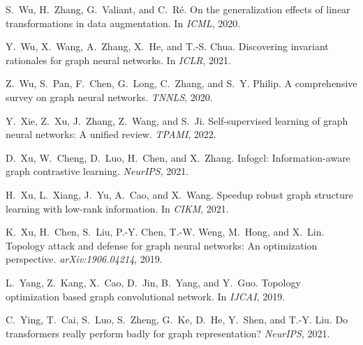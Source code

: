 \documentclass[11pt]{article}
\begin{document}
\begin{thebibliography}{10}
\begin{small}
S.~Wu, H.~Zhang, G.~Valiant, and C.~R{\'e}.
\newblock On the generalization effects of linear transformations in data
  augmentation.
\newblock In \emph{ICML}, 2020{}.

Y.~Wu, X.~Wang, A.~Zhang, X.~He, and T.-S. Chua.
\newblock Discovering invariant rationales for graph neural networks.
\newblock In \emph{ICLR}, 2021.

Z.~Wu, S.~Pan, F.~Chen, G.~Long, C.~Zhang, and S.~Y. Philip.
\newblock A comprehensive survey on graph neural networks.
\newblock \emph{TNNLS}, 2020{}.

Y.~Xie, Z.~Xu, J.~Zhang, Z.~Wang, and S.~Ji.
\newblock Self-supervised learning of graph neural networks: A unified review.
\newblock \emph{TPAMI}, 2022.

D.~Xu, W.~Cheng, D.~Luo, H.~Chen, and X.~Zhang.
\newblock Infogcl: Information-aware graph contrastive learning.
\newblock \emph{NeurIPS}, 2021{}.

H.~Xu, L.~Xiang, J.~Yu, A.~Cao, and X.~Wang.
\newblock Speedup robust graph structure learning with low-rank information.
\newblock In \emph{CIKM}, 2021{}.

K.~Xu, H.~Chen, S.~Liu, P.-Y. Chen, T.-W. Weng, M.~Hong, and X.~Lin.
\newblock Topology attack and defense for graph neural networks: An
  optimization perspective.
\newblock \emph{arXiv:1906.04214}, 2019.

L.~Yang, Z.~Kang, X.~Cao, D.~Jin, B.~Yang, and Y.~Guo.
\newblock Topology optimization based graph convolutional network.
\newblock In \emph{IJCAI}, 2019.

C.~Ying, T.~Cai, S.~Luo, S.~Zheng, G.~Ke, D.~He, Y.~Shen, and T.-Y. Liu.
\newblock Do transformers really perform badly for graph representation?
\newblock \emph{NeurIPS}, 2021.


\end{small}
\end{thebibliography}
\end{document}
